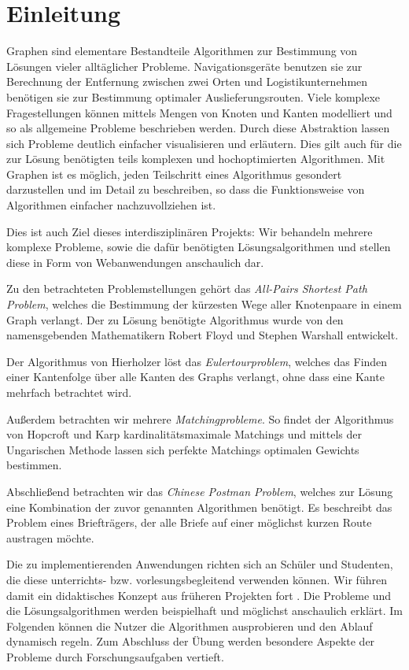 \chapter{Einleitung} %
Graphen sind elementare Bestandteile Algorithmen zur Bestimmung von Lösungen vieler alltäglicher Probleme. Navigationsgeräte benutzen sie zur Berechnung der Entfernung zwischen zwei Orten und Logistikunternehmen benötigen sie zur Bestimmung optimaler Auslieferungsrouten. Viele komplexe Fragestellungen können mittels Mengen von Knoten und Kanten modelliert und so als allgemeine Probleme beschrieben werden. Durch diese Abstraktion lassen sich Probleme deutlich einfacher visualisieren und erläutern. Dies gilt auch für die zur Lösung benötigten teils komplexen und hochoptimierten Algorithmen. Mit Graphen ist es möglich, jeden Teilschritt eines Algorithmus gesondert darzustellen und im Detail zu beschreiben, so dass die Funktionsweise von Algorithmen einfacher nachzuvollziehen ist.

Dies ist auch Ziel dieses interdisziplinären Projekts: Wir behandeln mehrere komplexe Probleme, sowie die dafür benötigten Lösungsalgorithmen und stellen diese in Form von Webanwendungen anschaulich dar.

Zu den betrachteten Problemstellungen gehört das \textit{All-Pairs Shortest Path Problem}, welches die Bestimmung der kürzesten Wege aller Knotenpaare in einem Graph verlangt. Der zu Lösung benötigte Algorithmus wurde von den namensgebenden Mathematikern Robert Floyd und Stephen Warshall entwickelt.

Der Algorithmus von Hierholzer löst das \textit{Eulertourproblem}, welches das Finden einer Kantenfolge über alle Kanten des Graphs verlangt, ohne dass eine Kante mehrfach betrachtet wird.

Außerdem betrachten wir mehrere \textit{Matchingprobleme}. So findet der Algorithmus von Hopcroft und Karp kardinalitätsmaximale Matchings und mittels der Ungarischen Methode lassen sich perfekte Matchings optimalen Gewichts bestimmen. 

Abschließend betrachten wir das \textit{Chinese Postman Problem}, welches zur Lösung eine Kombination der zuvor genannten Algorithmen benötigt. Es beschreibt das Problem eines Briefträgers, der alle Briefe auf einer möglichst kurzen Route austragen möchte.

Die zu implementierenden Anwendungen richten sich an Schüler und Studenten, die diese unterrichts- bzw. vorlesungsbegleitend verwenden können. Wir führen damit ein didaktisches Konzept aus früheren Projekten fort \parencite{Stotz2013, Velden2014, Sefidgar2015}. Die Probleme und die Lösungsalgorithmen werden beispielhaft und möglichst anschaulich erklärt. Im Folgenden können die Nutzer die Algorithmen ausprobieren und den Ablauf dynamisch regeln. Zum Abschluss der Übung werden besondere Aspekte der Probleme durch Forschungsaufgaben vertieft.


